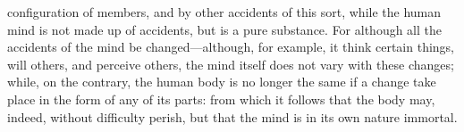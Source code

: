 configuration of members, and by other accidents of this sort, while the human mind is not made up of accidents, but is a pure substance. For although all the accidents of the mind be changed—although, for example, it think certain things, will others, and perceive others, the mind itself does not vary with these changes; while, on the contrary, the human body is no longer the same if a change take place in the form of any of its parts: from which it follows that the body may, indeed, without difficulty perish, but that the mind is in its own nature immortal.




